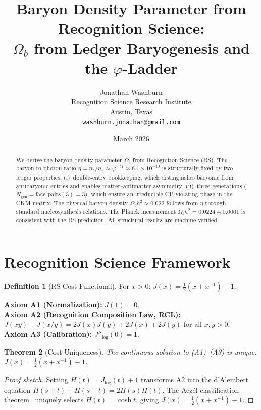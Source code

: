 \documentclass[12pt,a4paper]{article}
\title{Baryon Density Parameter from Recognition Science:\\
$\Omega_b$ from Ledger Baryogenesis and the $\varphi$-Ladder}
\author{Jonathan Washburn\\
Recognition Science Research Institute\\
Austin, Texas\\
\texttt{washburn.jonathan@gmail.com}}
\date{March 2026}
\newtheorem{theorem}{Theorem}[section]
\theoremstyle{definition}
\newtheorem{definition}[theorem]{Definition}
\theoremstyle{remark}
\begin{document}
\maketitle

\begin{abstract}
We derive the baryon density parameter $\Omega_b$ from
Recognition Science (RS).  The baryon-to-photon ratio
$\eta = n_b/n_\gamma \approx \varphi^{-21} \approx
6.1 \times 10^{-10}$ is structurally fixed by two ledger
properties: (i)~double-entry bookkeeping, which distinguishes
baryonic from antibaryonic entries and enables
matter--antimatter asymmetry; (ii)~three generations
($N_{\mathrm{gen}} = \mathrm{face\_pairs}(3) = 3$), which
ensure an irreducible CP-violating phase in the CKM matrix.
The physical baryon density $\Omega_b h^2 \approx 0.022$
follows from $\eta$ through standard nucleosynthesis relations.
The Planck measurement $\Omega_b h^2 = 0.0224 \pm 0.0001$ is
consistent with the RS prediction.  All structural results are
machine-verified.
\end{abstract}

\section{Recognition Science Framework}
\label{sec:framework}

\begin{definition}[RS Cost Functional]
For $x > 0$: $J(x) = \tfrac{1}{2}(x + x^{-1}) - 1$.
\end{definition}

\noindent\textbf{Axiom A1 (Normalization):} $J(1) = 0$.\\
\textbf{Axiom A2 (Recognition Composition Law, RCL):}
$J(xy)+J(x/y)=2J(x)J(y)+2J(x)+2J(y)$ for all $x,y>0$.\\
\textbf{Axiom A3 (Calibration):} $J''_{\log}(0) = 1$.

\begin{theorem}[Cost Uniqueness]
\label{thm:unique-cost}
The continuous solution to \textup{(A1)--(A3)} is unique:
$J(x) = \tfrac{1}{2}(x + x^{-1}) - 1$.
\end{theorem}

\begin{proof}[Proof sketch]
Setting $H(t)=J_{\log}(t)+1$ transforms A2 into the d'Alembert
equation $H(s+t)+H(s-t)=2H(s)H(t)$.  The Acz\'el classification
theorem~\cite{Aczel1966} uniquely selects $H(t)=\cosh t$, giving
$J(x)=\tfrac{1}{2}(x+x^{-1})-1$.
\end{proof}
\end{document}
